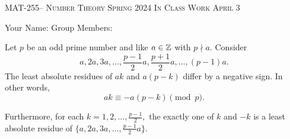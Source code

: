 \documentclass[handout]{ximera}
\date{April 3, 2024}
\begin{document}
\handoutAbstract
\maketitle
 	\begin{center}%
    	{\large \scshape MAT-255-- Number Theory 
			\hfill Spring 2024 
			\hfill In Class Work April 3}%
    
		{\large Your Name: \hrulefill \quad 
			Group Members:\hrulefill \quad 
			\hrulefill
			\par}%
 	\end{center}%
	 
\begin{lemma}\label{lem:residues-gauss-lem}
    Let $p$ be an odd prime number and like $a\in\mathbb Z$ with $p\nmid a.$ Consider  
        \[a,2a,3a,\dots,\frac{p-1}{2}a,\frac{p+1}{2}a,\dots,(p-1)a.\] 
    The least absolute residues of $ak$ and $a(p-k)$ differ by a negative sign. In other words, 
        \[ak\equiv -a(p-k)\pmod{p}.\]
        
    Furthermore, for each $k=1,2,\dots,\frac{p-1}{2},$ the exactly one of $k$ and $-k$ is a least absolute residue of $\{a,2a,3a,\dots,\frac{p-1}{2}a\}.$
\end{lemma}
\end{document}
